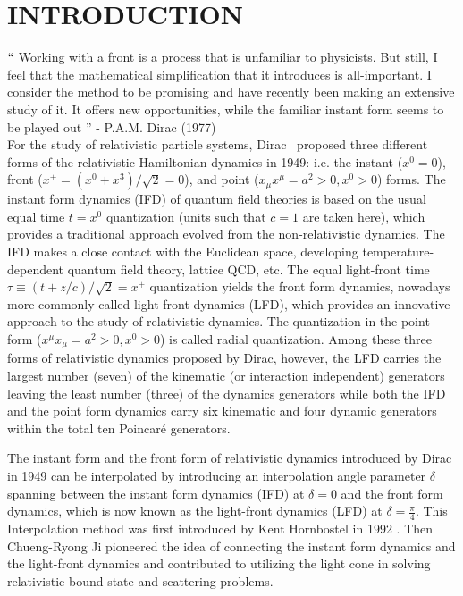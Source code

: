 \documentclass[12pt,a4paper]{report}
\begin{document}
\chapter{INTRODUCTION}
\setcounter{page}{1}
\noindent{\rule{\textwidth}{1.5pt}}
$``$ Working with a front is a process that is unfamiliar to physicists. But still, I feel that the mathematical simplification that it introduces is all-important. I consider the method to be promising and have recently been making an extensive study of it. It offers new opportunities, while the familiar instant form seems to be played out '' - P.A.M. Dirac (1977)\\

For the study of relativistic particle systems,
	Dirac~\cite{Dirac} proposed three different forms of the relativistic
	Hamiltonian dynamics in 1949: i.e. the instant ($x^0 =0$), front
	($x^+ = (x^0 + x^3)/\sqrt{2} = 0$), and point ($x_\mu x^\mu = a^2 >
	0, x^0 > 0$) forms.  The instant form dynamics (IFD) of quantum
	field theories is based on the usual equal time $t=x^0$ quantization
	(units such that $c=1$ are taken here), which provides 
	a traditional approach evolved from the non-relativistic dynamics. 
	The IFD makes a close contact with the Euclidean space, developing 
	temperature-dependent quantum field theory, lattice QCD, etc. 
	The equal light-front time $\tau \equiv (t +z/c)/\sqrt{2}=x^+$ quantization yields the front form dynamics, nowadays
	more commonly called light-front dynamics (LFD), which provides an innovative approach to the study of
	relativistic dynamics. 
	The quantization in the point form ($x^{\mu}x_{\mu}=a^{2}>0, x^{0}>0$) is called radial quantization. Among these three forms of relativistic dynamics proposed by Dirac, however, 
	the LFD carries the largest number (seven) of the kinematic (or interaction
	independent) generators leaving the least number (three) of the dynamics generators
	while both the IFD and the point form dynamics carry six kinematic and four dynamic generators 
	within the total ten Poincar\'e generators.\cite{poin, gauge, crji4} 
	
	
	The instant form and the front form of relativistic dynamics introduced by Dirac \cite{Dirac} in 1949 can be interpolated by introducing an interpolation angle parameter $\delta$ spanning between the instant form dynamics (IFD) at $\delta=0$ and the front form dynamics, which is now known as the light-front dynamics (LFD) at $\delta=\frac{\pi}{4}$. This Interpolation method was first introduced by Kent Hornbostel in 1992 \cite{Hornbostel}. Then Chueng-Ryong Ji \cite{poin, gauge, crji1, crji2, crji3, crji4} pioneered the idea of connecting the instant form dynamics and the light-front dynamics and contributed to utilizing the light cone in solving relativistic bound state and scattering problems.
	
\end{document}
